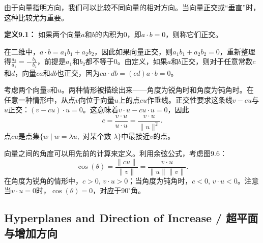 \begin{translation}
由于向量指明方向，我们可以比较不同向量的相对方向。当向量正交或``垂直''时，这种比较尤为重要。

\textbf{定义9.1：} 如果两个向量$a$和$b$的内积为0，即$a \cdot b = 0$，则称它们正交。

在二维中，$a \cdot b = a_1 b_1 + a_2 b_2$，因此如果向量正交，则$a_1 b_1 + a_2 b_2 = 0$，重新整理得$\frac{a_2}{a_1} = -\frac{b_1}{b_2}$，前提是$a_1$和$b_2$都不等于0。由定义，如果$a$和$b$正交，则对于任意常数$c$和$d$，向量$c a$和$d b$也正交，因为$c a \cdot d b = (cd) a \cdot b = 0$。

考虑两个向量$v$和$u$。两种情形被描绘出来——角度为锐角时和角度为钝角时。在任意一种情形中，从点$v$向位于向量$u$上的点$c u$作垂线。正交性要求这条线$v - c u$与$u$正交：$(v - c u) \cdot u = 0$。这意味着$v \cdot u - c u \cdot u = 0$，因此
\[
c = \frac{v \cdot u}{u \cdot u} = \frac{v \cdot u}{\|u\|^2}.
\]
点$c u$是点集$\{w \mid w = \lambda u, \text{ 对某个数 } \lambda\}$中最接近$v$的点。

向量之间的角度可以用先前的计算来定义。利用余弦公式，考虑图9.6：
\[
\cos(\theta) = \frac{\|c u\|}{\|v\|} = \frac{v \cdot u}{\|u\| \|v\|}.
\]
在角度为锐角的情形中，$c > 0$, $v \cdot u > 0$；当角度为钝角时，$c < 0$, $v \cdot u < 0$。注意当$v \cdot u = 0$时，$\cos(\theta) = 0$，对应于$90^\circ$角。
\end{translation}

\subsection{Hyperplanes and Direction of Increase / 超平面与增加方向}

